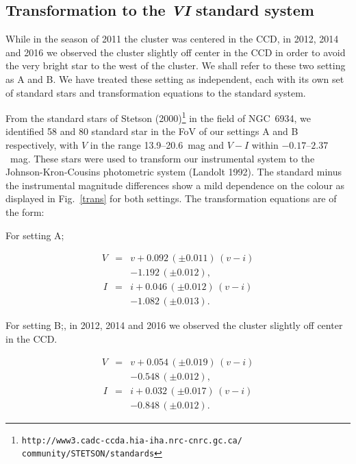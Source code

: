 \documentclass[journal]{rmaa}
\newcommand{\1}{\'{\i}}
\begin{document}
\subsection{Transformation to the \textit{VI} standard system}

While in the season of 2011 the cluster was centered in the CCD, in 2012, 2014 and
2016
we observed the cluster slightly off center in the CCD in order to avoid
the very bright star to the west of the cluster. We shall refer to these two
setting as A and B.
We have treated these setting as independent, each with its own set of standard
stars and transformation equations to the standard system.

From the standard stars of Stetson (2000)\footnote{%
 \texttt{http://www3.cadc-ccda.hia-iha.nrc-cnrc.gc.ca/\\
community/STETSON/standards}}
in the field of NGC~6934, we identified 58 and 80 standard star in the FoV of our
settings A and B respectively, with $V$ in the range 13.9--20.6~mag and $V-I$
within $-0.17$--$2.37$~mag. These stars were used to transform our instrumental system
to the Johnson-Kron-Cousins photometric system (Landolt 1992). The standard minus the
instrumental magnitude differences show a mild dependence on the colour as displayed
in Fig.~\ref{trans} for both settings. The transformation equations are of the form:
%

\noindent
For setting A;

\begin{eqnarray}\label{eq:transV}
V &=& v +0.092\, (\pm0.011)\, (v-i) \nonumber \\
  && -1.192\, (\pm0.012),
\end{eqnarray}
%
\begin{eqnarray}\label{eq:transI}
I &=& i +0.046\, (\pm0.012)\, (v-i) \nonumber \\
  && -1.082\, (\pm0.013).
\end{eqnarray}

\noindent
For setting B;, in 2012, 2014 and 2016 we
observed the cluster slightly off center in the CCD.

\begin{eqnarray}\label{eq:transV}
V &=& v +0.054\, (\pm0.019)\, (v-i) \nonumber \\
  && -0.548\, (\pm0.012),
\end{eqnarray}
%
\begin{eqnarray}\label{eq:transI}
I &=& i +0.032\, (\pm0.017)\, (v-i) \nonumber \\
  && -0.848\, (\pm0.012).
\end{eqnarray}
\end{document}

